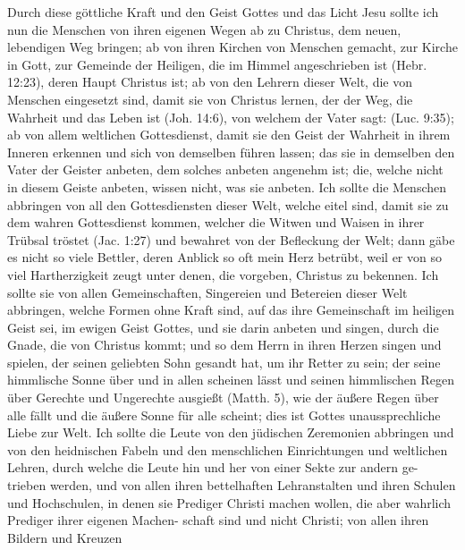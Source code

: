 Durch diese göttliche Kraft und den Geist Gottes und das
Licht Jesu sollte ich nun die Menschen von ihren eigenen Wegen
ab zu Christus, dem neuen, lebendigen Weg bringen; ab von
ihren Kirchen von Menschen gemacht, zur Kirche in Gott, zur
Gemeinde der Heiligen, die im Himmel angeschrieben ist 
(Hebr. 12:23),
deren Haupt Christus ist; ab von den Lehrern dieser Welt, die
von Menschen eingesetzt sind, damit sie von Christus lernen, der
der Weg, die Wahrheit und das Leben ist 
(Joh. 14:6), von welchem
der Vater sagt:  
(Luc. 9:35);
ab von allem weltlichen Gottesdienst, 
damit sie den Geist der 
Wahrheit in ihrem Inneren erkennen und sich von demselben führen
lassen; das sie in demselben den Vater der Geister anbeten, dem
solches anbeten angenehm ist; die, welche nicht in diesem Geiste
anbeten, wissen nicht, was sie anbeten. Ich sollte die Menschen
abbringen von all den Gottesdiensten dieser Welt, welche eitel
sind, damit sie zu dem wahren Gottesdienst kommen, welcher die
Witwen und Waisen in ihrer Trübsal tröstet 
(Jac. 1:27) und bewahret 
von der Befleckung der Welt; dann gäbe es nicht so viele
Bettler, deren Anblick so oft mein Herz betrübt, weil er von so
viel Hartherzigkeit zeugt unter denen, die vorgeben, Christus zu
bekennen. Ich sollte sie von allen 
Gemeinschaften, Singereien
und Betereien dieser Welt abbringen, 
welche Formen ohne Kraft
sind, auf das ihre Gemeinschaft im heiligen Geist sei, im ewigen
Geist Gottes, und sie darin anbeten und singen, durch die Gnade,
die von Christus kommt; und so dem Herrn in ihren Herzen
singen und spielen, der seinen geliebten Sohn gesandt hat, um
ihr Retter zu sein; der seine himmlische Sonne über und in allen
scheinen lässt und seinen himmlischen Regen über Gerechte und
Ungerechte ausgießt (Matth. 5), 
wie der äußere Regen über alle
fällt und die äußere Sonne für alle scheint; dies ist Gottes 
unaussprechliche Liebe zur Welt. Ich sollte die Leute von den
jüdischen Zeremonien abbringen und von 
den heidnischen Fabeln
und den menschlichen Einrichtungen und weltlichen Lehren, durch
welche die Leute hin und her von einer Sekte zur andern ge-
trieben werden, und von allen ihren bettelhaften Lehranstalten
und ihren Schulen und Hochschulen, in denen sie Prediger Christi
machen wollen, die aber wahrlich Prediger ihrer eigenen Machen-
schaft sind und nicht Christi; von allen ihren Bildern und Kreuzen

